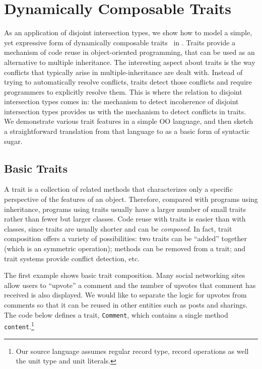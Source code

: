 \section{Dynamically Composable Traits} \label{sec:trait}


As an application of disjoint intersection types, we show how to model a
simple, yet expressive form of dynamically composable
traits~\cite{scharli2003traits} in \name. Traits provide a
mechanism of code reuse in object-oriented programming, that
can be used as an alternative to multiple inheritance.
The interesting aspect about traits is the way conflicts that
typically arise in multiple-inheritance are dealt with.
Instead of trying to automatically resolve conflicts, traits
detect those conflicts and require programmers to explicitly resolve
them. This is where the relation to disjoint intersection types comes
in: the mechanism to detect incoherence of disjoint intersection types
provides us with the mechanism to detect conflicts in traits.
We demonstrate various trait
features in a simple OO language, and then sketch a straightforward
translation from that language to \name as a basic form of
syntactic sugar. 

\subsection{Basic Traits}

A trait is a collection of related methods that characterizes only a specific
perspective of the features of an object. Therefore, compared with
programs using inheritance, programs using traits usually have a
larger number of small
traits rather than fewer but larger classes. Code reuse with traits is easier
than with classes, since traits are usually shorter and can
be \emph{composed}. In fact, trait composition offers a variety of
possibilities: two traits can be ``added'' together (which is an symmetric
operation); methods can be removed from a trait; and trait systems provide
conflict detection, etc.

The first example shows basic trait composition. Many social networking sites
allow users to ``upvote'' a comment and the number of upvotes that comment has
received is also displayed. We would like to separate the logic for upvotes from
comments so that it can be reused in other entities such as posts and sharings.
The code below defines a trait, \lstinline$Comment$, which contains a single
method \lstinline$content$.\footnote{Our source language assumes regular record
type, record operations as well the unit type and unit literals.}

